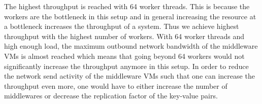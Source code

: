 The highest throughput is reached with 64 worker threads. This is because the workers are the bottleneck in this setup and in general increasing the resource at a bottleneck increases the throughput of a system. Thus we achieve highest throughput with the highest number of workers.
With 64 worker threads and high enough load, the maximum outbound network bandwidth of the middleware VMs is almost reached which means that going beyond 64 workers would not significantly increase the throughput anymore in this setup. In order to reduce the network send activity of the middleware VMs such that one can increase the throughput even more, one would have to either increase the number of middlewares or decrease the replication factor of the key-value pairs.


